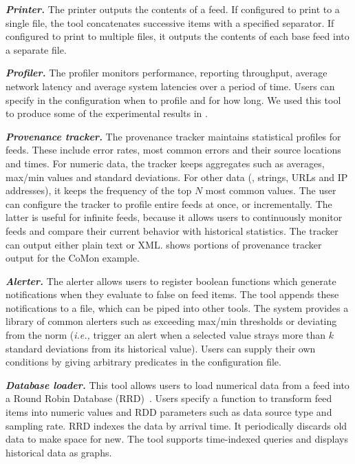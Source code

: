 \textbf{\textit{Printer.}} The printer outputs the contents of a
feed.  If configured to print to a single file, the tool concatenates
successive items with a specified separator. If configured to print to
multiple files, it outputs the contents of each base feed into a
separate file. 


\textbf{\textit{Profiler.}} The profiler monitors performance, reporting
throughput, average network latency and average system latencies
over a period of time. Users can specify in the configuration 
when to profile and for how long.  We used this tool to produce
some of the experimental results in .

\textbf{\textit{Provenance tracker.}} The provenance tracker
maintains statistical profiles for feeds. These include error
rates, most common errors and their source locations and times.
For numeric data, the tracker keeps aggregates such
as averages, max/min values and standard deviations. For other
data (\eg{}, strings, URLs and IP addresses), it keeps the
frequency of the top $N$ most common values. 
The user can configure the tracker to profile entire
feeds at once, or incrementally. The latter is useful for infinite
feeds, because it allows users to continuously monitor feeds
and compare their current behavior with historical statistics.  The
tracker can output either plain text or XML. 
 shows portions of provenance tracker output
for the CoMon example.

\textbf{\textit{Alerter.}} The alerter allows users to register boolean 
functions which generate notifications when they evaluate to false on
feed items. The tool appends these notifications to a file, which can
be piped into other tools.  The system provides a library of 
common alerters such as exceeding max/min thresholds or deviating from the norm
({\em i.e.,} trigger an alert when a selected value strays more than $k$
standard deviations from its historical value). 
Users can supply their own conditions by giving arbitrary \ocaml{} predicates
in the configuration file.

\textbf{\textit{Database loader.}} This tool allows users to load numerical
data from a feed into a Round Robin Database
(RRD)~\cite{rrdtool}. Users specify a function to transform
feed items into numeric values and RDD parameters such as data source 
type and sampling rate. RRD indexes the data by arrival time.  It
periodically discards old data to make space for new. The tool
supports time-indexed queries and displays historical data as graphs.

